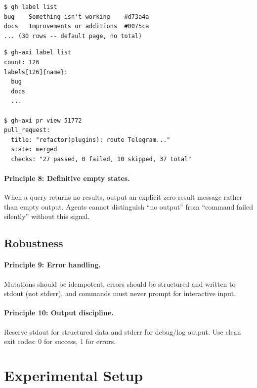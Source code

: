 \documentclass{article}
\begin{document}
\begin{lstlisting}[caption={Conventional: no total count, no CI summary.}]
$ gh label list
bug    Something isn't working    #d73a4a
docs   Improvements or additions  #0075ca
... (30 rows -- default page, no total)
\end{lstlisting}

\begin{lstlisting}[caption={AXI: total count included, CI pre-computed.}]
$ gh-axi label list
count: 126
labels[126]{name}:
  bug
  docs
  ...

$ gh-axi pr view 51772
pull_request:
  title: "refactor(plugins): route Telegram..."
  state: merged
  checks: "27 passed, 0 failed, 10 skipped, 37 total"
\end{lstlisting}

\paragraph{Principle 8: Definitive empty states.}
When a query returns no results, output an explicit zero-result message
rather than empty output. Agents cannot distinguish ``no output'' from
``command failed silently'' without this signal.

\subsection{Robustness}

\paragraph{Principle 9: Error handling.}
Mutations should be idempotent, errors should be structured and written to
stdout (not stderr), and commands must never prompt for interactive input.

\paragraph{Principle 10: Output discipline.}
Reserve stdout for structured data and stderr for debug/log output. Use
clean exit codes: 0 for success, 1 for errors.

\section{Experimental Setup}
\label{sec:setup}
\end{document}
